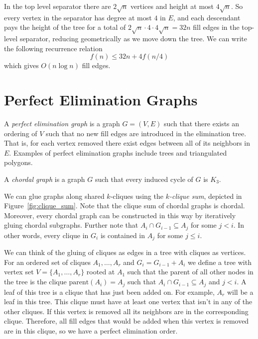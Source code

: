 \documentclass{article}
\begin{document}
In the top level separator there are $2\sqrt{n}$ vertices and height at most $4\sqrt{n}$.
So every vertex in the separator has degree at most $4$ in $E$, and each descendant pays the height of the tree for a total of $2\sqrt{n}\cdot 4\cdot 4\sqrt{n} = 32 n$ fill edges in the top-level separator, reducing geometrically as we move down the tree.
We can write the following recurrence relation
\[ f(n)\leq 32n + 4 f(n/4) \]
which gives $O(n\log n)$ fill edges.

\section{Perfect Elimination Graphs}

A \emph{perfect elimination graph} is a graph $G=(V,E)$ such that there exists an ordering of $V$ such that no new fill edges are introduced in the elimination tree.
That is, for each vertex removed there exist edges between all of its neighbors in $E$.
Examples of perfect elimination graphs include trees and triangulated polygons.

\begin{definition}
    A \emph{chordal graph} is a graph $G$ such that every induced cycle of $G$ is $K_3$.
\end{definition}



We can glue graphs along shared $k$-cliques using the \emph{$k$-clique sum}, depicted in Figure~\ref{fig:clique_sum}.
Note that the clique sum of chordal graphs is chordal.
Moreover, every chordal graph can be constructed in this way by iteratively gluing chordal subgraphs.
Further note that $A_i\cap G_{i-1}\subseteq A_j$ for some $j < i$.
In other words, every clique in $G_i$ is contained in $A_j$ for some $j\leq i$.

We can think of the gluing of cliques as edges in a tree with cliques as vertices.
For an ordered set of cliques $A_1,\ldots, A_r$ and $G_i = G_{i-1} + A_i$ we define a tree with vertex set $V=\{A_1,\ldots, A_r\}$ rooted at $A_1$ such that the parent of all other nodes in the tree is the clique $\mathrm{parent}(A_i) = A_j$ such that $A_i\cap G_{i-1} \subseteq A_j$ and $j < i$.
A leaf of this tree is a clique that has just been added on.
For example, $A_r$ will be a leaf in this tree.
This clique must have at least one vertex that isn't in any of the other cliques.
If this vertex is removed all its neighbors are in the corresponding clique.
Therefore, all fill edges that would be added when this vertex is removed are in this clique, so we have a perfect elimination order.
\end{document}
